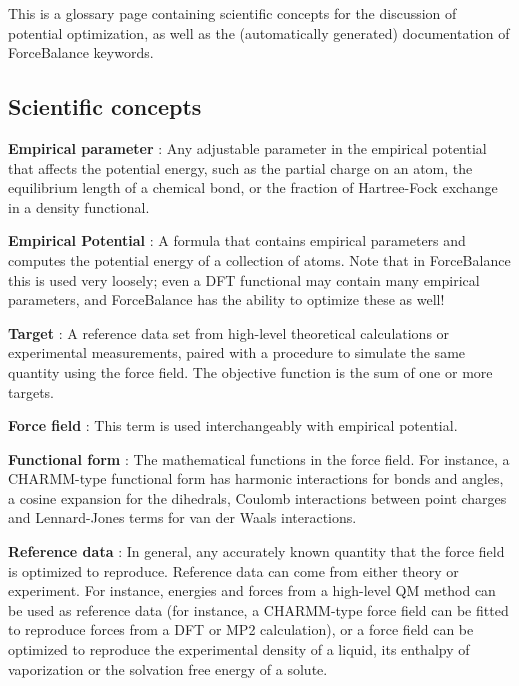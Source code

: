 This is a glossary page containing scientific concepts for the discussion of potential optimization, as well as the (automatically generated) documentation of Force\-Balance keywords.\hypertarget{glossary_concepts}{}\subsection{Scientific concepts}\label{glossary_concepts}
\begin{DoxyItemize}
\item {\bfseries  Empirical parameter } \-: Any adjustable parameter in the empirical potential that affects the potential energy, such as the partial charge on an atom, the equilibrium length of a chemical bond, or the fraction of Hartree-\/\-Fock exchange in a density functional.\end{DoxyItemize}
\begin{DoxyItemize}
\item {\bfseries  Empirical Potential } \-: A formula that contains empirical parameters and computes the potential energy of a collection of atoms. Note that in Force\-Balance this is used very loosely; even a D\-F\-T functional may contain many empirical parameters, and Force\-Balance has the ability to optimize these as well!\end{DoxyItemize}
\begin{DoxyItemize}
\item {\bfseries  Target } \-: A reference data set from high-\/level theoretical calculations or experimental measurements, paired with a procedure to simulate the same quantity using the force field. The objective function is the sum of one or more targets.\end{DoxyItemize}
\begin{DoxyItemize}
\item {\bfseries  Force field } \-: This term is used interchangeably with empirical potential.\end{DoxyItemize}
\begin{DoxyItemize}
\item {\bfseries  Functional form } \-: The mathematical functions in the force field. For instance, a C\-H\-A\-R\-M\-M-\/type functional form has harmonic interactions for bonds and angles, a cosine expansion for the dihedrals, Coulomb interactions between point charges and Lennard-\/\-Jones terms for van der Waals interactions.\end{DoxyItemize}
\begin{DoxyItemize}
\item {\bfseries  Reference data } \-: In general, any accurately known quantity that the force field is optimized to reproduce. Reference data can come from either theory or experiment. For instance, energies and forces from a high-\/level Q\-M method can be used as reference data (for instance, a C\-H\-A\-R\-M\-M-\/type force field can be fitted to reproduce forces from a D\-F\-T or M\-P2 calculation), or a force field can be optimized to reproduce the experimental density of a liquid, its enthalpy of vaporization or the solvation free energy of a solute.\end{DoxyItemize}
